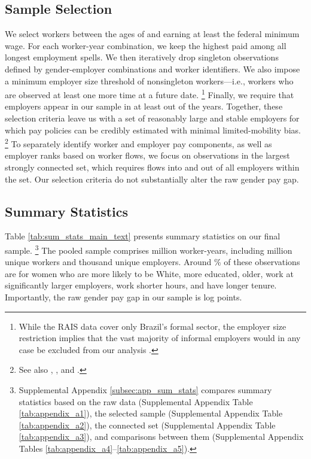 \subsection{Sample Selection}

We select workers between the ages of {\agemin} and {\agemax} earning at least the federal minimum wage. For each worker-year combination, we keep the highest paid among all longest employment spells. We then iteratively drop singleton observations defined by gender-employer combinations and worker identifiers. We also impose a minimum employer size threshold of {\Nminsingletons} nonsingleton workers---i.e., workers who are observed at least one more time at a future date.%
%
\footnote{While the RAIS data cover only Brazil's formal sector, the employer size restriction implies that the vast majority of informal employers would in any case be excluded from our analysis \citep{Ulyssea2018, Dix-CarneiroGoldbergMeghirUlyssea2024}.} %
%
Finally, we require that employers appear in our sample in at least {\Nminyears} out of the {\Nyears} years. Together, these selection criteria leave us with a set of reasonably large and stable employers for which pay policies can be credibly estimated with minimal limited-mobility bias.%
%
\footnote{See also \citet{KlineSaggioSolvsten2020}, \citet{BorovickovaShimer2020}, and \citet{BonhommeHolzheuLamadonManresaMogstadSetzler2023}.} %
%
To separately identify worker and employer pay components, as well as employer ranks based on worker flows, we focus on observations in the largest strongly connected set, which requires flows into and out of all employers within the set. %
%
Our selection criteria do not substantially alter the raw gender pay gap.


\subsection{Summary Statistics}

Table \ref{tab:sum_stats_main_text} presents summary statistics on our final sample.%
%
\footnote{Supplemental Appendix \ref{subsec:app_sum_stats} compares summary statistics based on the raw data (Supplemental Appendix Table \ref{tab:appendix_a1}), the selected sample (Supplemental Appendix Table \ref{tab:appendix_a2}), the connected set (Supplemental Appendix Table \ref{tab:appendix_a3}), and comparisons between them (Supplemental Appendix Tables \ref{tab:appendix_a4}--\ref{tab:appendix_a5}).} %
%
The pooled sample comprises  million worker-years, including  million unique workers and  thousand unique employers. Around \% of these observations are for women who are more likely to be White, more educated, older, work at significantly larger employers, work shorter hours, and have longer tenure. %
%
Importantly, the raw gender pay gap in our sample is  log points.


